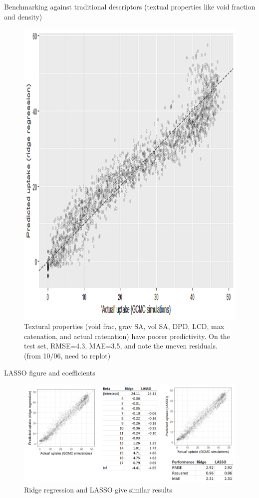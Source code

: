 \documentclass[letterpaper]{article}
\begin{document}
\begin{outline}
	\1 Benchmarking against traditional descriptors (textual properties like void fraction and density)
	\begin{figure}[H]
		\centering
		\includegraphics[width=0.5\columnwidth]{Figs/textural_prediction.png}
		\caption{Textural properties (void frac, grav SA, vol SA, DPD, LCD, max catenation, and actual catenation) have poorer predictivity.  On the test set, RMSE=4.3, MAE=3.5, and note the uneven residuals. (from 10/06, need to replot)}
		\label{fig:textural}
	\end{figure}
	\1 LASSO figure and coefficients
	\begin{figure}[H]
		\centering
		\includegraphics[width=0.75\columnwidth]{Figs/ridge_vs_lasso.png}
		\caption{Ridge regression and LASSO give similar results}
		\label{fig:lasso}
	\end{figure}
	
\end{outline}
\end{document}
